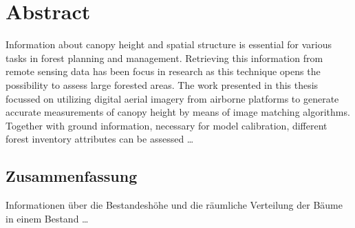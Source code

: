 
\begingroup
\let\clearpage\relax
\let\cleardoublepage\relax
\let\cleardoublepage\relax

\chapter*{Abstract}
Information about canopy height and spatial structure is essential for various tasks in forest planning and management. Retrieving this information from remote sensing data has been focus in research as this technique opens the possibility to assess large forested areas. 
The work presented in this thesis focussed on utilizing digital aerial imagery from airborne platforms to generate accurate measurements of canopy height by means of image matching algorithms. Together with ground information, necessary for model calibration, different forest inventory attributes can be assessed \dots

\vfill

\begin{otherlanguage}{ngerman}
	
\chapter*{Zusammenfassung}
Informationen über die Bestandeshöhe und die räumliche Verteilung der Bäume in einem Bestand \dots 

\end{otherlanguage}



\endgroup			

\vfill

